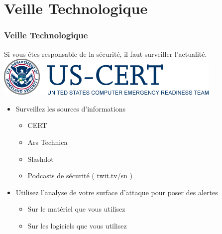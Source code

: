
\section{Veille Technologique}

\begin{frame}
\frametitle{Veille Technologique}

\begin{center}
Si vous êtes responsable de la sécurité, il faut surveiller l'actualité.\\
\vspace{2em}
\includegraphics[scale=0.44]{res/cert}

\begin{itemize}
    \item Surveillez les sources d'informations
    \begin{itemize}
        \item CERT
        \item Ars Technica
        \item Slashdot
        \item Podcasts de sécurité ( twit.tv/sn )
    \end{itemize}
    \item Utilisez l'analyse de votre surface d'attaque pour poser des alertes
    \begin{itemize}
        \item Sur le matériel que vous utilisez
        \item Sur les logiciels que vous utilisez
    \end{itemize}
\end{itemize}


\end{center}




\end{frame}

